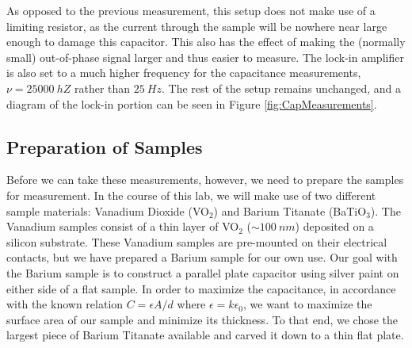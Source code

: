 \documentclass[%
 reprint,
 amsmath,amssymb,
 aps,
 pra,
]{revtex4-1}
\begin{document}
As opposed to the previous measurement, this setup does not make use of a limiting resistor, as the current through the sample will be nowhere near large enough to damage this capacitor. This also has the effect of making the (normally small) out-of-phase signal larger and thus easier to measure. The lock-in amplifier is also set to a much higher frequency for the capacitance measurements, $\nu = 25000~hZ$ rather than $25~Hz$. The rest of the setup remains unchanged, and a diagram of the lock-in portion can be seen in Figure \ref{fig:CapMeasurements}.

\subsection{Preparation of Samples}

Before we can take these measurements, however, we need to prepare the samples for measurement. In the course of this lab, we will make use of two different sample materials: Vanadium Dioxide (VO$_2$) and Barium Titanate (BaTiO$_3$). The Vanadium samples consist of a thin layer of VO$_2$ ($\sim 100~nm$) deposited on a silicon substrate. These Vanadium samples are pre-mounted on their electrical contacts, but we have prepared a Barium sample for our own use. Our goal with the Barium sample is to construct a parallel plate capacitor using silver paint on either side of a flat sample. In order to maximize the capacitance, in accordance with the known relation $C = \epsilon A/d$ where $\epsilon = k \epsilon_0$, we want to maximize the surface area of our sample and minimize its thickness. To that end, we chose the largest piece of Barium Titanate available and carved it down to a thin flat plate.
\end{document}
